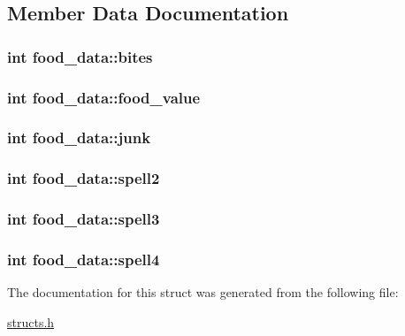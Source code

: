 \subsection{Member Data Documentation}
\hypertarget{structfood__data_a669ba701301395c18b9a3fa1d91bd731}{
\subsubsection[{bites}]{\setlength{\rightskip}{0pt plus 5cm}int food\-\_\-data\-::bites}}\label{structfood__data_a669ba701301395c18b9a3fa1d91bd731}
\hypertarget{structfood__data_aee57d73b40a6d430c9d3f57cede2b24f}{
\subsubsection[{food\-\_\-value}]{\setlength{\rightskip}{0pt plus 5cm}int food\-\_\-data\-::food\-\_\-value}}\label{structfood__data_aee57d73b40a6d430c9d3f57cede2b24f}
\hypertarget{structfood__data_a03968a2d2e00be0a73e3dee094b0daf6}{
\subsubsection[{junk}]{\setlength{\rightskip}{0pt plus 5cm}int food\-\_\-data\-::junk}}\label{structfood__data_a03968a2d2e00be0a73e3dee094b0daf6}
\hypertarget{structfood__data_a6cff52d0911c9d4c3e657019eebfd5e6}{
\subsubsection[{spell2}]{\setlength{\rightskip}{0pt plus 5cm}int food\-\_\-data\-::spell2}}\label{structfood__data_a6cff52d0911c9d4c3e657019eebfd5e6}
\hypertarget{structfood__data_a012498bdbd43d58c2fddd522e4bfd9c5}{
\subsubsection[{spell3}]{\setlength{\rightskip}{0pt plus 5cm}int food\-\_\-data\-::spell3}}\label{structfood__data_a012498bdbd43d58c2fddd522e4bfd9c5}
\hypertarget{structfood__data_af2d5608e4c68d2531ec342f891c1041b}{
\subsubsection[{spell4}]{\setlength{\rightskip}{0pt plus 5cm}int food\-\_\-data\-::spell4}}\label{structfood__data_af2d5608e4c68d2531ec342f891c1041b}


The documentation for this struct was generated from the following file\-:\begin{DoxyCompactItemize}
\item 
\hyperlink{structs_8h}{structs.\-h}\end{DoxyCompactItemize}
